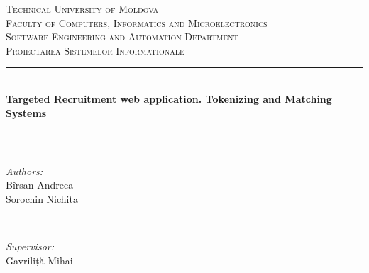 \begin{titlepage}
	
	
	\newcommand{\HRule}{\rule{\linewidth}{0.5mm}} 

	\begin{center}

	\textsc{\large Technical University of Moldova} \\[0.5cm]
	\textsc{\large Faculty of Computers, Informatics and Microelectronics} \\[0.5cm]
	\textsc{\large Software Engineering and Automation Department} \\[5cm] 
	
	\textsc{\Large Proiectarea Sistemelor Informationale} \\[0.5cm] 


	\HRule \\[0.5cm]
	\LARGE{\textbf{Targeted Recruitment web application. Tokenizing and Matching Systems}} \\[0.1cm]
	\HRule \\[5cm]

	\begin{minipage}{0.4\textwidth}
		\begin{flushleft} \large
			\emph{Authors:}\\
			Bîrsan Andreea \\
			Sorochin Nichita \\
		\end{flushleft}
	\end{minipage}
	~
	\begin{minipage}{0.4\textwidth}
		\begin{flushright} \large
			\emph{Supervisor:} \\
			Gavriliță Mihai
		\end{flushright}
	\end{minipage}\\[4cm]


\end{center}
\end{titlepage}
